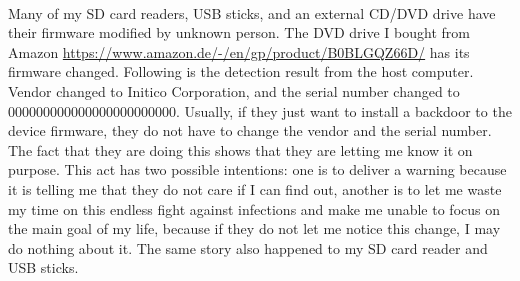 \documentclass[mscthesis]{usiinfthesis}
\begin{document}
\paragraph{}
Many of my SD card readers, USB sticks, and an external CD/DVD drive have their firmware modified by unknown person. The DVD drive I bought from Amazon \url{https://www.amazon.de/-/en/gp/product/B0BLGQZ66D/} has its firmware changed. Following is the detection result from the host computer. Vendor changed to Initico Corporation, and the serial number changed to 000000000000000000000000. Usually, if they just want to install a backdoor to the device firmware, they do not have to change the vendor and the serial number. The fact that they are doing this shows that they are letting me know it on purpose. This act has two possible intentions: one is to deliver a warning because it is telling me that they do not care if I can find out, another is to let me waste my time on this endless fight against infections and make me unable to focus on the main goal of my life, because if they do not let me notice this change, I may do nothing about it. The same story also happened to my SD card reader and USB sticks.
\end{document}
